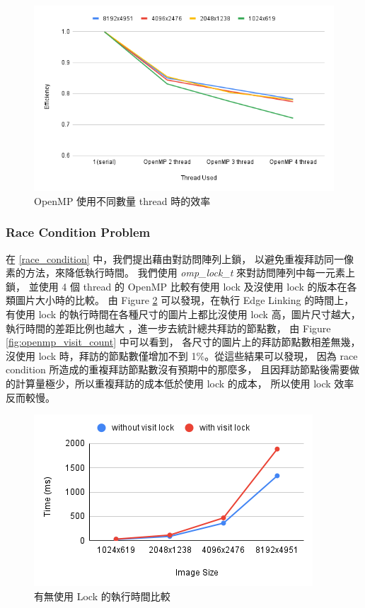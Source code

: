 \documentclass[sigconf,nonacm]{acmart}
\begin{document}
\begin{figure}[htbp]
  \centering
  \includegraphics[width=\linewidth]{"./image/openmp_efficiency.png"}
  \caption{OpenMP 使用不同數量 thread 時的效率}
  \label{fig:openmp_efficiency}
\end{figure}

\subsubsection{Race Condition Problem}

在 \ref{race_condition} 中，我們提出藉由對訪問陣列上鎖，
以避免重複拜訪同一像素的方法，來降低執行時間。
我們使用 \emph{omp\_lock\_t} 來對訪問陣列中每一元素上鎖，
並使用 4 個 thread 的 OpenMP 比較有使用 lock 及沒使用 lock 的版本在各類圖片大小時的比較。
由 Figure \ref{fig:openmp_visit_lock} 可以發現，在執行 Edge Linking 的時間上，
有使用 lock 的執行時間在各種尺寸的圖片上都比沒使用 lock 高，圖片尺寸越大，
執行時間的差距比例也越大 ，進一步去統計總共拜訪的節點數，
由 Figure \ref{fig:openmp_visit_count} 中可以看到，
各尺寸的圖片上的拜訪節點數相差無幾，
沒使用 lock 時，拜訪的節點數僅增加不到 1\%。從這些結果可以發現，
因為 race condition 所造成的重複拜訪節點數沒有預期中的那麼多，
且因拜訪節點後需要做的計算量極少，所以重複拜訪的成本低於使用 lock 的成本，
所以使用 lock 效率反而較慢。

\begin{figure}
  \centering
  \includegraphics[width=\linewidth]{"./image/openmp_visit_lock.png"}
  \caption{有無使用 Lock 的執行時間比較}
  \label{fig:openmp_visit_lock}
\end{figure}
\end{document}
